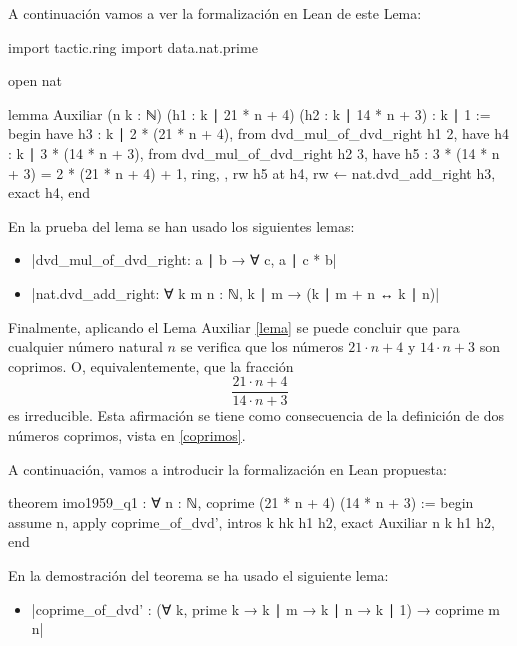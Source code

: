 A continuación vamos a ver la formalización en Lean de este Lema:

\begin{leancode}
import tactic.ring
import data.nat.prime

open nat

lemma Auxiliar
  (n k : ℕ)
  (h1 : k ∣ 21 * n + 4)
  (h2 : k ∣ 14 * n + 3)
  : k ∣ 1 :=
begin
  have h3 : k ∣ 2 * (21 * n + 4),
    from dvd_mul_of_dvd_right h1 2,
  have h4 : k ∣ 3 * (14 * n + 3),
    from dvd_mul_of_dvd_right h2 3,
  have h5 : 3 * (14 * n + 3) = 2 * (21 * n + 4) + 1,
    { ring, },
  rw h5 at h4,
  rw ← nat.dvd_add_right h3,
  exact h4,
end
\end{leancode}

En la prueba del lema se han usado los siguientes lemas:
\begin{itemize}
\item {}|dvd_mul_of_dvd_right: a ∣ b → ∀ c, a ∣ c * b|
\item {}|nat.dvd_add_right: ∀ {k m n : ℕ}, k ∣ m → (k ∣ m + n ↔ k ∣ n)|
\end{itemize}

Finalmente, aplicando el Lema Auxiliar \ref{lema} se puede concluir que para
cualquier número natural \(n\) se verifica que los números \(21⋅n+4\)
y \(14⋅n+3\) son coprimos. O, equivalentemente, que la fracción
\begin{equation*}
  \frac{21⋅n+4}{14⋅n+3}
\end{equation*}
es irreducible. Esta afirmación se tiene como consecuencia de la
definición de dos números coprimos, vista en \ref{coprimos}.

A continuación, vamos a introducir la formalización en Lean propuesta:

\begin{leancode}
theorem imo1959_q1 : ∀ n : ℕ, coprime (21 * n + 4) (14 * n + 3) :=
begin
  assume n,
  apply coprime_of_dvd',
  intros k hk h1 h2,
  exact Auxiliar n k h1 h2,
end
\end{leancode}

En la demostración del teorema se ha usado el siguiente lema:
\begin{itemize}
\item {}|coprime_of_dvd' :
  (∀ k, prime k → k ∣ m → k ∣ n → k ∣ 1) → coprime m n|
\end{itemize}

